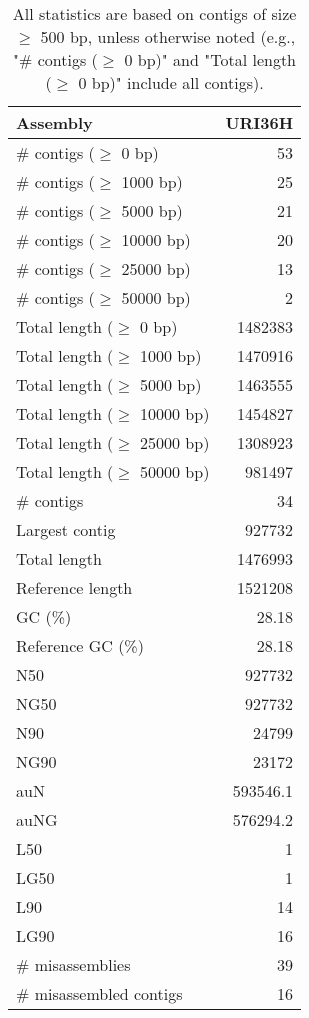\documentclass[12pt,a4paper]{article}
\begin{document}
\begin{table}[ht]
\begin{center}
\caption{All statistics are based on contigs of size $\geq$ 500 bp, unless otherwise noted (e.g., "\# contigs ($\geq$ 0 bp)" and "Total length ($\geq$ 0 bp)" include all contigs).}
\begin{tabular}{|l*{1}{|r}|}
\hline
Assembly & URI36H \\ \hline
\# contigs ($\geq$ 0 bp) & 53 \\ \hline
\# contigs ($\geq$ 1000 bp) & 25 \\ \hline
\# contigs ($\geq$ 5000 bp) & 21 \\ \hline
\# contigs ($\geq$ 10000 bp) & 20 \\ \hline
\# contigs ($\geq$ 25000 bp) & 13 \\ \hline
\# contigs ($\geq$ 50000 bp) & 2 \\ \hline
Total length ($\geq$ 0 bp) & 1482383 \\ \hline
Total length ($\geq$ 1000 bp) & 1470916 \\ \hline
Total length ($\geq$ 5000 bp) & 1463555 \\ \hline
Total length ($\geq$ 10000 bp) & 1454827 \\ \hline
Total length ($\geq$ 25000 bp) & 1308923 \\ \hline
Total length ($\geq$ 50000 bp) & 981497 \\ \hline
\# contigs & 34 \\ \hline
Largest contig & 927732 \\ \hline
Total length & 1476993 \\ \hline
Reference length & 1521208 \\ \hline
GC (\%) & 28.18 \\ \hline
Reference GC (\%) & 28.18 \\ \hline
N50 & 927732 \\ \hline
NG50 & 927732 \\ \hline
N90 & 24799 \\ \hline
NG90 & 23172 \\ \hline
auN & 593546.1 \\ \hline
auNG & 576294.2 \\ \hline
L50 & 1 \\ \hline
LG50 & 1 \\ \hline
L90 & 14 \\ \hline
LG90 & 16 \\ \hline
\# misassemblies & 39 \\ \hline
\# misassembled contigs & 16 \\ \hline

\end{tabular}
\end{center}
\end{table}
\end{document}
